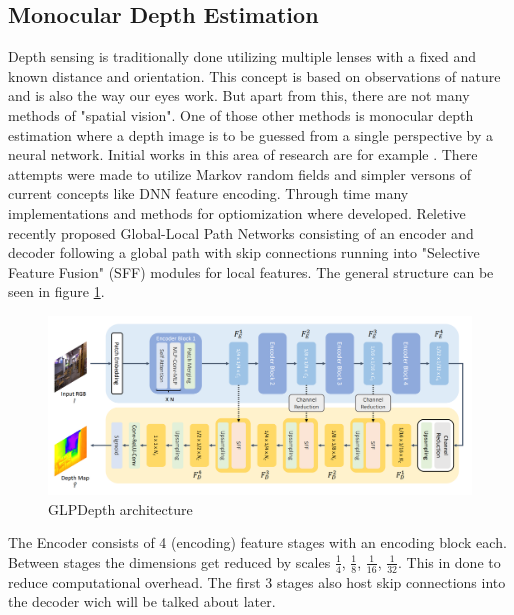 \subsection*{Monocular Depth Estimation}

Depth sensing is traditionally done utilizing multiple lenses with a fixed and known distance and orientation. This concept is based on observations of nature and is also the way our eyes work.
But apart from this, there are not many methods of "spatial vision". One of those other methods is monocular depth estimation where a depth image is to be guessed from a single perspective by a neural network. Initial works in this area of research are for example 
. There attempts were made to utilize Markov random fields and simpler versons of current concepts like DNN feature encoding.
Through time many implementations and methods for optiomization where developed. Reletive recently 
\cite{kim2022global}
proposed Global-Local Path Networks consisting of an encoder and decoder following a global path with skip connections running into "Selective Feature Fusion" (SFF) modules for local features. The general structure can be seen in figure \ref*{GLPDepth_arch}.

\begin{figure}[ht]
    \begin{center}
        \includegraphics*[scale=.22, pagebox=artbox]{resources/GLPDepth.png}
        \caption{GLPDepth architecture} \label{GLPDepth_arch}
    \end{center}
\end{figure}

The Encoder consists of 4 (encoding) feature stages with an encoding block each. Between stages the dimensions get reduced by scales $\frac{1}{4}$, $\frac{1}{8}$, $\frac{1}{16}$, $\frac{1}{32}$. This in done to reduce computational overhead. The first 3 stages also host skip connections into the decoder wich will be talked about later.

